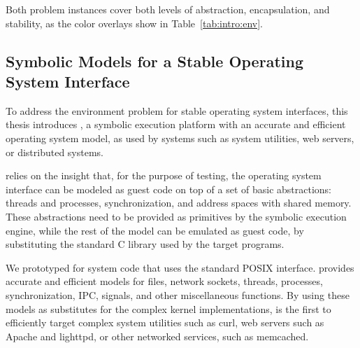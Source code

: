 Both problem instances cover both levels of abstraction, encapsulation, and stability, as the color overlays show in Table~\ref{tab:intro:env}.

\subsection{Symbolic Models for a Stable Operating System Interface}


To address the environment problem for stable operating system interfaces, this thesis introduces \cnine, a symbolic execution platform with an accurate and efficient operating system model, as used by systems such as system utilities, web servers, or distributed systems.



\cnine relies on the insight that, for the purpose of testing, the operating system interface can be modeled as guest code on top of a set of basic abstractions: threads and processes, synchronization, and address spaces with shared memory.
%
These abstractions need to be provided as primitives by the symbolic execution engine, while the rest of the model can be emulated as guest code, by substituting the standard C library used by the target programs.



We prototyped \cnine for system code that uses the standard POSIX interface.  \cnine provides accurate and efficient models for files, network sockets, threads, processes, synchronization, IPC, signals, and other miscellaneous functions.
%
By using these models as substitutes for the complex kernel implementations, \cnine is the first to efficiently target complex system utilities such as \textsf{curl}, web servers such as Apache and lighttpd, or other networked services, such as memcached.


